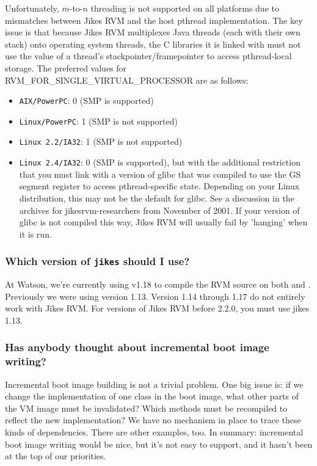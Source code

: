 Unfortunately, $m$-to-$n$ threading is not supported on all platforms due to
mismatches between Jikes RVM  and the host pthread implementation.  
The key issue is that because Jikes RVM multiplexes Java threads
(each with their own stack) onto operating system threads, the
C libraries it is linked with must not use the value of a thread's
stackpointer/framepointer to access pthread-local storage.  The
preferred values for RVM\_FOR\_SINGLE\_VIRTUAL\_PROCESSOR are as
follows: 
\begin{itemize}
\item {\tt AIX/PowerPC}: 0 (SMP is supported)
\item {\tt Linux/PowerPC}:  1 (SMP is not supported)
\item {\tt Linux 2.2/IA32}: 1 (SMP is not supported)
\item {\tt Linux 2.4/IA32}: 0 (SMP is supported), but with the
additional restriction that you must link with a version of glibc that
was compiled to use the GS segment register to access pthread-specific
state.  Depending on your Linux distribution, this may not be the
default for glibc. See a discussion in the archives for
jikesrvm-researchers from November of 2001. If your version of glibc
is not compiled this way, Jikes RVM  will usually fail by 'hanging' when
it is run.
\end{itemize}                

\subsubsection{Which version of {\tt jikes} should I use?}
At Watson, we're currently using  v1.18
to compile the RVM source on both \LinuxR{} and \AIXTM. Previously we
were using version 1.13. Version 1.14 through 1.17 do not entirely
work with Jikes RVM.  For versions of Jikes RVM before 2.2.0, you must
use jikes 1.13.

\subsubsection{Has anybody thought about incremental boot image writing?}

Incremental boot image building is not a trivial problem.  One big
issue is: if we change the implementation of one class in the boot image,
what other parts of the VM image must be invalidated?  Which
methods must be recompiled to reflect the new implementation?  We have no
mechanism in place to trace these kinds of dependencies.  There are other
examples, too.  In summary: incremental boot image writing would be nice,
but it's not easy to support, and it hasn't been at the top of our
priorities.

